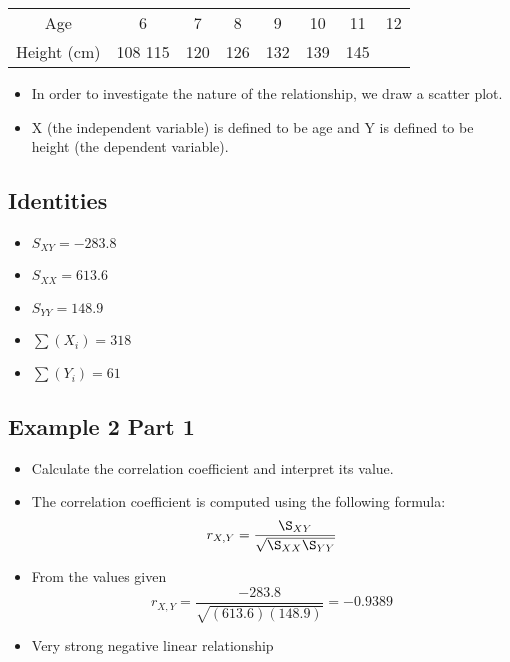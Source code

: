 \documentclass[]{report}
\begin{document}
\begin{center}
	\begin{tabular}{|c|c|c|c|c|c|c|c|}
		Age  & 6 & 7  & 8 & 9 & 10 & 11 & 12 \\ 
		Height (cm)& 108 115& 120 &126& 132& 139 & 145\\
	\end{tabular} 
	
\end{center}

\begin{itemize}
	\item In order to investigate the nature of the relationship, we draw a
	scatter plot.
	\item X (the independent variable) is defined to be age and Y is defined
	to be height (the dependent variable).
\end{itemize}



\subsection{Identities}
\begin{itemize}
	\item $S_{XY} = -283.8$
	\item $S_{XX} = 613.6$
	\item $S_{YY} = 148.9$
	\item $\sum(X_i)  = 318 $
	\item $\sum(Y_i)  = 61$
\end{itemize}



\subsection{Example 2 Part 1}

\begin{itemize}
	\item Calculate the correlation coefficient and interpret its value.
	\item The correlation coefficient is computed using the following formula:
	\[ r_{X,Y} = \frac{\S_{XY}}{\sqrt{\S_{XX}\S_{YY}}} \]
	\item From the values given
	\[ r_{X,Y} = \frac{-283.8}{\sqrt{(613.6)(148.9)}} = -0.9389 \]
	\item Very strong negative linear relationship
\end{itemize}
\end{document}
